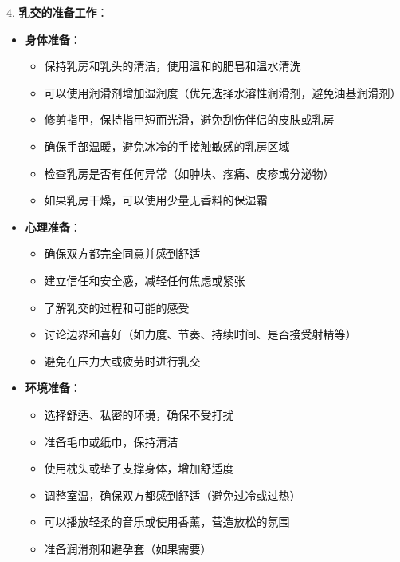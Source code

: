 \documentclass[12pt,UTF8]{ctexbook}
\begin{document}
4. \textbf{乳交的准备工作}：
\begin{itemize}
	\item \textbf{身体准备}：
	\begin{itemize}
		\item 保持乳房和乳头的清洁，使用温和的肥皂和温水清洗
		\item 可以使用润滑剂增加湿润度（优先选择水溶性润滑剂，避免油基润滑剂）
		\item 修剪指甲，保持指甲短而光滑，避免刮伤伴侣的皮肤或乳房
		\item 确保手部温暖，避免冰冷的手接触敏感的乳房区域
		\item 检查乳房是否有任何异常（如肿块、疼痛、皮疹或分泌物）
		\item 如果乳房干燥，可以使用少量无香料的保湿霜
	\end{itemize}
	\item \textbf{心理准备}：
	\begin{itemize}
		\item 确保双方都完全同意并感到舒适
		\item 建立信任和安全感，减轻任何焦虑或紧张
		\item 了解乳交的过程和可能的感受
		\item 讨论边界和喜好（如力度、节奏、持续时间、是否接受射精等）
		\item 避免在压力大或疲劳时进行乳交
	\end{itemize}
	\item \textbf{环境准备}：
	\begin{itemize}
		\item 选择舒适、私密的环境，确保不受打扰
		\item 准备毛巾或纸巾，保持清洁
		\item 使用枕头或垫子支撑身体，增加舒适度
		\item 调整室温，确保双方都感到舒适（避免过冷或过热）
		\item 可以播放轻柔的音乐或使用香薰，营造放松的氛围
		\item 准备润滑剂和避孕套（如果需要）
	\end{itemize}
\end{itemize}
\end{document}
